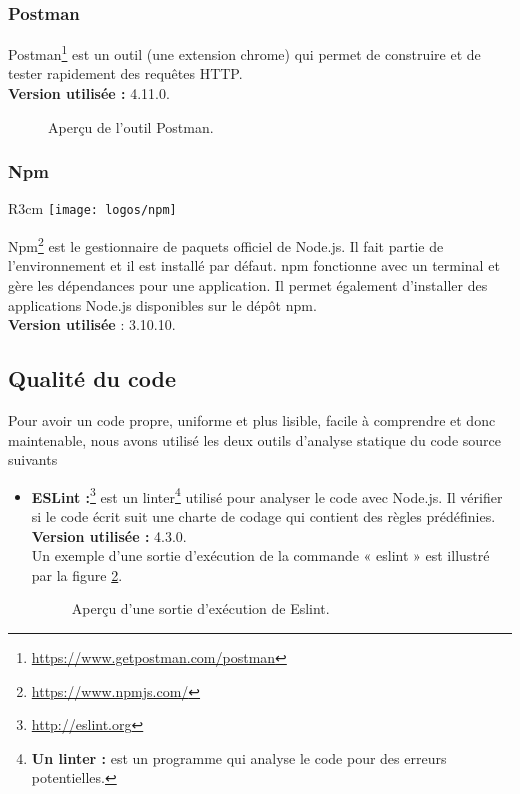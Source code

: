 \subsubsection{Postman}

Postman\footnote{\href{https://www.getpostman.com/postman}{https://www.getpostman.com/postman}} est un outil (une extension chrome) qui permet de construire et de tester rapidement des requêtes HTTP.\\
\textbf{Version utilisée :} 4.11.0.

\begin{figure}[H]
	\centering
	\caption{Aperçu de l’outil Postman.}
	\label{fig:chapitre2fingerstat}
\end{figure}
\subsubsection{Npm} 
\begin{wrapfigure}{R}{3cm}
	\vspace{-20px}
	\texttt{[image: logos/npm]}
\end{wrapfigure}
Npm\footnote{\href{https://www.npmjs.com/}{https://www.npmjs.com/}} est le gestionnaire de paquets officiel de Node.js. Il fait partie de l'environnement et il est installé par défaut. npm fonctionne avec un terminal et gère les dépendances pour une application. Il permet également d'installer des applications Node.js disponibles sur le dépôt npm.\\
\textbf{Version utilisée }: 3.10.10.

\subsection{Qualité du code }
Pour avoir un code propre, uniforme et plus lisible, facile à comprendre et donc maintenable, nous avons utilisé les deux outils d'analyse statique du code source suivants 
\begin{itemize}
	\item \textbf{ESLint :}\footnote{\href{http://eslint.org}{http://eslint.org}} est un linter\footnote{\textbf{Un linter :} est un programme qui analyse le code pour des erreurs potentielles.} utilisé pour analyser le code avec Node.js. Il vérifier si le code écrit suit une charte de codage qui contient des règles prédéfinies.\\
	\textbf{Version utilisée :} 4.3.0.
	\\
	Un exemple d’une sortie d'exécution de la commande « eslint » est illustré par la figure \ref{fig:realisationeslint}.
	\begin{figure}[H]
		\centering
		\caption{Aperçu d’une sortie d'exécution de Eslint.}
		\label{fig:realisationeslint}
	\end{figure}
	

\end{itemize}
